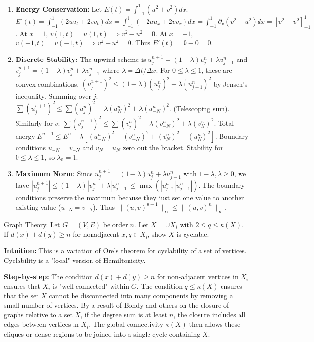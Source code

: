 \begin{solution}
\begin{enumerate}
    \item[(1)] \textbf{Energy Conservation:}
    Let $E(t) = \int_{-1}^1 (u^2 + v^2) dx$.
    $E'(t) = \int_{-1}^1 (2u u_t + 2v v_t) dx = \int_{-1}^1 (-2u u_x + 2v v_x) dx = \int_{-1}^1 \partial_x (v^2 - u^2) dx = [v^2 - u^2]_{-1}^1$.
    At $x=1$, $v(1,t) = u(1,t) \implies v^2 - u^2 = 0$.
    At $x=-1$, $u(-1,t) = v(-1,t) \implies v^2 - u^2 = 0$.
    Thus $E'(t) = 0 - 0 = 0$.
    
    \item[(2)] \textbf{Discrete Stability:}
    The upwind scheme is $u_j^{n+1} = (1-\lambda) u_j^n + \lambda u_{j-1}^n$ and $v_j^{n+1} = (1-\lambda) v_j^n + \lambda v_{j+1}^n$ where $\lambda = \Delta t / \Delta x$.
    For $0 \leq \lambda \leq 1$, these are convex combinations.
    $(u_j^{n+1})^2 \leq (1-\lambda) (u_j^n)^2 + \lambda (u_{j-1}^n)^2$ by Jensen's inequality.
    Summing over $j$: $\sum (u_j^{n+1})^2 \leq \sum (u_j^n)^2 - \lambda (u_N^n)^2 + \lambda (u_{-N}^n)^2$. (Telescoping sum).
    Similarly for $v$: $\sum (v_j^{n+1})^2 \leq \sum (v_j^n)^2 - \lambda (v_{-N}^n)^2 + \lambda (v_N^n)^2$.
    Total energy $E^{n+1} \leq E^n + \lambda [ (u_{-N}^n)^2 - (v_{-N}^n)^2 + (v_N^n)^2 - (u_N^n)^2 ]$.
    Boundary conditions $u_{-N} = v_{-N}$ and $v_N = u_N$ zero out the bracket.
    Stability for $0 \leq \lambda \leq 1$, so $\lambda_0 = 1$.
    
    \item[(3)] \textbf{Maximum Norm:}
    Since $u_j^{n+1} = (1-\lambda) u_j^n + \lambda u_{j-1}^n$ with $1-\lambda, \lambda \geq 0$, we have
    $|u_j^{n+1}| \leq (1-\lambda)|u_j^n| + \lambda |u_{j-1}^n| \leq \max(|u_j^n|, |u_{j-1}^n|)$.
    The boundary conditions preserve the maximum because they just set one value to another existing value ($u_{-N} = v_{-N}$).
    Thus $\|(u, v)^{n+1}\|_\infty \leq \|(u, v)^n\|_\infty$.
\end{enumerate}
\end{solution}

\begin{exercise}
\label{applied:2013:11}
Graph Theory. Let $G=(V,E)$ be order $n$. Let $X = \cup X_i$ with $2 \leq q \leq \kappa(X)$. If $d(x)+d(y) \geq n$ for nonadjacent $x,y \in X_i$, show $X$ is cyclable.
\end{exercise}

\begin{solution}
\textbf{Intuition:} This is a variation of Ore's theorem for cyclability of a set of vertices. Cyclability is a "local" version of Hamiltonicity.

\textbf{Step-by-step:}
The condition $d(x)+d(y) \ge n$ for non-adjacent vertices in $X_i$ ensures that $X_i$ is "well-connected" within $G$.
The condition $q \le \kappa(X)$ ensures that the set $X$ cannot be disconnected into many components by removing a small number of vertices.
By a result of Bondy and others on the closure of graphs relative to a set $X$, if the degree sum is at least $n$, the closure includes all edges between vertices in $X_i$.
The global connectivity $\kappa(X)$ then allows these cliques or dense regions to be joined into a single cycle containing $X$.
\end{solution}
